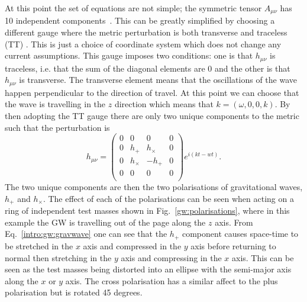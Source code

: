 At this point the set of equations are not simple; the symmetric tensor $A_{\mu \nu}$ has 10 independent
components~. This can be greatly
simplified by choosing a different gauge where the metric perturbation is both
transverse and traceless (TT) \citep{flanagan2005BasicsGravitational}.  This is
just a choice of coordinate system which does not change any current
assumptions. This gauge imposes two conditions: one
is that $h_{\mu \nu}$ is traceless, i.e. that the sum of the diagonal elements
are 0 and the other is that $h_{\mu \nu}$ is transverse.  The transverse
element means that the oscillations of the wave happen perpendicular to the
direction of travel.  At this point we can choose that the wave is travelling in
the $z$ direction which means that $k = (\omega,0,0,k)$.  By then adopting the
TT gauge there are only two unique components to the metric such that the
perturbation is
\begin{equation}
\label{intro:gw:gravwave}
h_{\mu \nu} = \left( 
\begin{matrix}
0 & 0 & 0 & 0 \\
0 & h_{+} & h_{\times} & 0 \\
0 & h_{\times} & -h_{+} & 0 \\
0 & 0 & 0 & 0 \\
\end{matrix}
\right) 
e^{i(kt - wt)}.
\end{equation}
The two unique components are then the two polarisations of gravitational
waves, $h_{+}$ and $h_{\times}$. The effect of each of the polarisations can be seen when acting on a ring of independent test masses shown in Fig.~\ref{gw:polarisations}, where in this example the \gls{GW} is travelling out of the page along the $z$ axis.
From Eq.~\ref{intro:gw:gravwave} one can see that the $h_{+}$ component causes space-time to be stretched in the $x$ axis and compressed in the $y$ axis before returning to normal then stretching in the $y$ axis and compressing in the $x$ axis. This can be seen as the test masses being distorted into an ellipse with the semi-major axis along the $x$ or $y$ axis.
The cross polarisation has a similar affect to the plus polarisation but is rotated 45 degrees.
%
